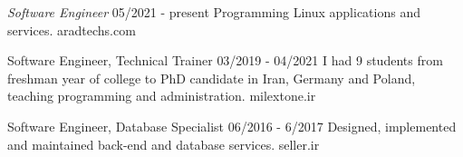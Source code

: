 \documentclass[a4paper,12pt]{memoir} %
\begin{document}
\userinformation %

\framebreak %


\CVDate






\Sep %




{\textit{Software Engineer}}
{05/2021 - present}
{Programming Linux applications and services.}
{aradtechs.com}


{Software Engineer, Technical Trainer}
{03/2019 - 04/2021}
{I had 9 students from freshman year of college to PhD candidate in Iran, Germany and Poland, teaching programming and administration.}
{milextone.ir}


{Software Engineer, Database Specialist}
{06/2016 - 6/2017}
{Designed, implemented and maintained back-end and database services.}
{seller.ir}
\end{document}
